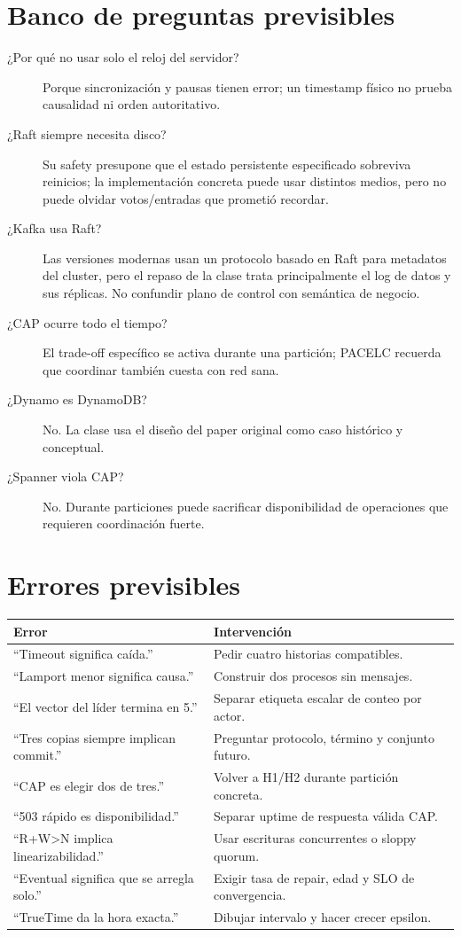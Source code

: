 \documentclass[variant=docente,cover=institutional,mode=screen]{ua-engineering-v6-article}
\begin{document}
\section{Banco de preguntas previsibles}
\begin{description}
\item[¿Por qué no usar solo el reloj del servidor?] Porque sincronización y pausas tienen error; un timestamp físico no prueba causalidad ni orden autoritativo.
\item[¿Raft siempre necesita disco?] Su safety presupone que el estado persistente especificado sobreviva reinicios; la implementación concreta puede usar distintos medios, pero no puede olvidar votos/entradas que prometió recordar.
\item[¿Kafka usa Raft?] Las versiones modernas usan un protocolo basado en Raft para metadatos del cluster, pero el repaso de la clase trata principalmente el log de datos y sus réplicas. No confundir plano de control con semántica de negocio.
\item[¿CAP ocurre todo el tiempo?] El trade-off específico se activa durante una partición; PACELC recuerda que coordinar también cuesta con red sana.
\item[¿Dynamo es DynamoDB?] No. La clase usa el diseño del paper original como caso histórico y conceptual.
\item[¿Spanner viola CAP?] No. Durante particiones puede sacrificar disponibilidad de operaciones que requieren coordinación fuerte.
\end{description}

\section{Errores previsibles}
\begin{longtable}{p{}p{}}
\toprule
Error & Intervención\\
\midrule
“Timeout significa caída.” & Pedir cuatro historias compatibles.\\
“Lamport menor significa causa.” & Construir dos procesos sin mensajes.\\
“El vector del líder termina en 5.” & Separar etiqueta escalar de conteo por actor.\\
“Tres copias siempre implican commit.” & Preguntar protocolo, término y conjunto futuro.\\
“CAP es elegir dos de tres.” & Volver a H1/H2 durante partición concreta.\\
“503 rápido es disponibilidad.” & Separar uptime de respuesta válida CAP.\\
“R+W>N implica linearizabilidad.” & Usar escrituras concurrentes o sloppy quorum.\\
“Eventual significa que se arregla solo.” & Exigir tasa de repair, edad y SLO de convergencia.\\
“TrueTime da la hora exacta.” & Dibujar intervalo y hacer crecer epsilon.\\
\bottomrule
\end{longtable}
\end{document}
